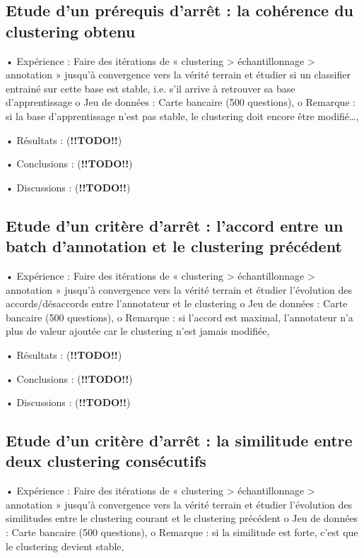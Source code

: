        \subsection{Etude d’un prérequis d’arrêt : la cohérence du clustering obtenu}

        •	Expérience : Faire des itérations de « clustering > échantillonnage > annotation » jusqu’à convergence vers la vérité terrain et étudier si un classifier entrainé sur cette base est stable, i.e. s’il arrive à retrouver sa base d’apprentissage 
            o	Jeu de données : Carte bancaire (500 questions),
            o	Remarque : si la base d’apprentissage n’est pas stable, le clustering doit encore être modifié…,

        •	Résultats : (\textbf{!!TODO!!})

        •	Conclusions : (\textbf{!!TODO!!})

        •	Discussions : (\textbf{!!TODO!!})


        \subsection{Etude d’un critère d’arrêt : l’accord entre un batch d’annotation et le clustering précédent}

        •	Expérience : Faire des itérations de « clustering > échantillonnage > annotation » jusqu’à convergence vers la vérité terrain et étudier l’évolution des accords/désaccords entre l’annotateur et le clustering
            o	Jeu de données : Carte bancaire (500 questions),
            o	Remarque : si l’accord est maximal, l’annotateur n’a plus de valeur ajoutée car le clustering n’est jamais modifiée,

        •	Résultats : (\textbf{!!TODO!!})
        
        •	Conclusions : (\textbf{!!TODO!!})

        •	Discussions : (\textbf{!!TODO!!})


        \subsection{Etude d’un critère d’arrêt : la similitude entre deux clustering consécutifs}

        •	Expérience : Faire des itérations de « clustering > échantillonnage > annotation » jusqu’à convergence vers la vérité terrain et étudier l’évolution des similitudes entre le clustering courant et le clustering précédent
            o	Jeu de données : Carte bancaire (500 questions),
            o	Remarque : si la similitude est forte, c’est que le clustering devient stable,
        
